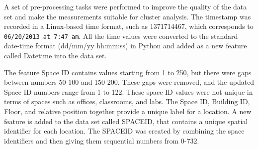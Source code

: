     



A set of pre-processing tasks were performed to improve the quality of the data set and make the measurements suitable for cluster analysis.
The timestamp was recorded in a Linux-based time format, such as 1371714467, which corresponds to \texttt{06/20/2013 at 7:47 am}. All the time values were converted to the standard date-time format (dd/mm/yy hh:mm:ss) in Python and added as a new feature called Datetime into the data set.

The feature Space ID contains values starting from 1 to 250, but there were gaps between numbers 50-100 and 150-200. These gaps were removed, and the updated Space ID numbers range from 1 to 122.
These space ID values were not unique in terms of spaces such as offices, classrooms, and labs. 
The Space ID, Building ID, Floor, and relative position together provide a unique label for a location. A new feature is added to the data set called SPACEID, that contains a unique spatial identifier for each location. The SPACEID was created by combining the space identifiers and then giving them sequential numbers from 0-732.

